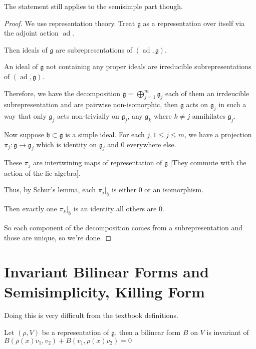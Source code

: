 \documentclass{article}
\theoremstyle{definition}
\newcommand{\ad}{\operatorname{ad}}
\begin{document}
The statement still applies to the semisimple part though.

\begin{proof}
    We use representation theory. Treat \(\mathfrak{g} \) as a representation over itself via the adjoint action \(\ad\).

    Then ideals of \(\mathfrak{g} \) are subrepresentations of \((\ad,\mathfrak{g} )\).

    An ideal of \(\mathfrak{g} \) not containing any proper ideals are irreducible subrepresentations of \((\ad,\mathfrak{g} )\).

    Therefore, we have the decomposition \(\mathfrak{g} =\bigoplus_{j=1}^{m} \mathfrak{g} _{j} \) each of them an irrdeucible subrepresentation and are pairwise non-isomorphic, then \(\mathfrak{g} \) acts on \(\mathfrak{g} _{j}  \) in such a way that only \(\mathfrak{g}_{j} \) acts non-trivially on \(\mathfrak{g}_{j} \), any \(\mathfrak{g}_{k} \) where \(k\neq j\) annihilates \(\mathfrak{g} _{j} \).  

    Now suppose \(\mathfrak{h}\subset \mathfrak{g} \) is a simple ideal. For each \(j,1\leq j\leq m\), we have a projection \(\pi _j:\mathfrak{g}\to \mathfrak{g} _{j} \) which is identity on \(\mathfrak{g}_{j} \) and \(0\) everywhere else.
        
    These \(\pi_{j} \) are intertwining maps of representation of \(\mathfrak{g} \) [They commute with the action of the lie algebra].

    Thus, by Schur's lemma, each \(\pi_j|_{\mathfrak{h} }\) is either \(0\) or an isomorphism. 

    Then exactly one \(\pi_k|_\mathfrak{h} \) is an identity all others are \(0\).

    So each component of the decomposition comes from a subrepresentation and those are unique, so we're done.

\end{proof}

\section*{Invariant Bilinear Forms and Semisimplicity, Killing Form}

Doing this is very difficult from the textbook definitions.

Let \((\rho ,V)\) be a representation of \(\mathfrak{g} \), then a bilinear form \(B\) on \(V\) is invariant of \(B(\rho (x)v_1,v_2)+B(v_1,\rho(x)v_2)=0\) 
\end{document}
